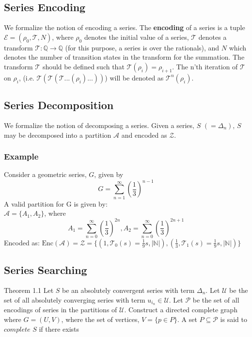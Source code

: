 \documentclass{article}
\begin{document}
\subsection{Series Encoding}

We formalize the notion of encoding a series. The \textbf{encoding} of a series is a tuple 
$\mathcal{E} = (\rho_{0}, \mathcal{T}, N)$, where $\rho_{0}$ denotes the initial value of a series, 
$\mathcal{T}$ denotes a transform $\mathcal{T}: \mathbb{Q} \rightarrow \mathbb{Q}$ (for this purpose, 
a series is over the rationals), and $N$ which denotes the number of transition states in the transform for 
the summation. The transform $\mathcal{T}$ should be defined such that $\mathcal{T}(\rho_{i}) = \rho_{i+1}$.
The n'th iteration of $\mathcal{T}$ on $\rho_{i}$, (i.e. $\mathcal{T}(\mathcal{T}(\mathcal{T}...(\rho_{i})...))$) will 
be denoted as $\mathcal{T}^n(\rho_{i})$.

\subsection{Series Decomposition}

We formalize the notion of decomposing a series. Given a series, $S$ $(=\Delta_n)$, $S$ may be decomposed 
into a partition $\mathcal{A}$ and encoded as $\mathcal{Z}$.

\subsubsection{Example} 

Consider a geometric series, $G$, given by \[ G = \sum_{n=1}^{\infty} (\frac{1}{3})^{n-1} \]
A valid partition for G is given by:\\
$\mathcal{A} = \{A_1, A_2\}$, where\\ \[A_1 = \sum_{n=0}^{\infty} (\frac{1}{3})^{2n} , A_2 = \sum_{n=0}^{\infty} (\frac{1}{3})^{2n+1} \]
Encoded as: $\text{Enc}(\mathcal{A}) = \mathcal{Z} = 
\{(1, \mathcal{T}_0(s) = \frac{1}{9}s, |\mathbb{N}|),(\frac{1}{3}, \mathcal{T}_1(s) = \frac{1}{9}s, |\mathbb{N}|) \}$

\subsection{Series Searching}

Theorem 1.1
Let $S$ be an absolutely convergent series with term $\Delta_n$.
Let $\mathcal{U}$ be the set of all absolutely converging series with term $u_{i_n} \in \mathcal{U}$. 
Let $\mathcal{P}$ be the set of all encodings of series in the partitions of $\mathcal{U}$. 
Construct a directed complete graph where $G = (U, V)$, where the set of vertices, $V = \{p \in P\}$. 
A set $P \subseteq \mathcal{P}$ is said to $complete$ $S$ if there exists 
\end{document}
